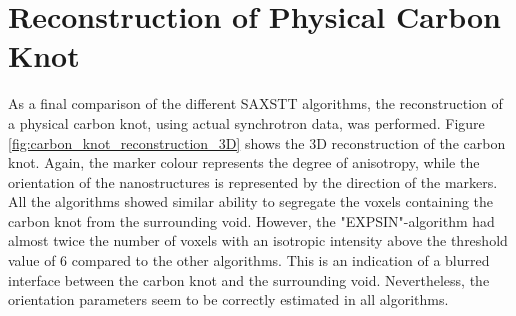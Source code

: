 \clearpage
\section{Reconstruction of Physical Carbon Knot}\label{sec:reconstruction_physical_carbon_knot}

As a final comparison of the different SAXSTT algorithms, the reconstruction of a physical carbon knot, using actual synchrotron data, was performed.
Figure \ref{fig:carbon_knot_reconstruction_3D} shows the 3D reconstruction of the carbon knot.
Again, the marker colour represents the degree of anisotropy, while the orientation of the nanostructures is represented by the direction of the markers.
All the algorithms showed similar ability to segregate the voxels containing the carbon knot from the surrounding void.
However, the "EXPSIN"-algorithm had almost twice the number of voxels with an isotropic intensity above the threshold value of 6 compared to the other algorithms.
This is an indication of a blurred interface between the carbon knot and the surrounding void.
Nevertheless, the orientation parameters seem to be correctly estimated in all algorithms.

\clearpage

